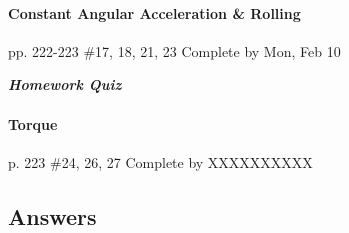 \documentclass[10pt]{exam}
\begin{document}



\paragraph{Constant Angular Acceleration \& Rolling} pp. 222-223 \#17, 18, 21, 23
\dotfill Complete by Mon, Feb 10

\hfill \textbf{\emph{Homework Quiz}}





\paragraph{Torque} p. 223 \#24, 26, 27
\dotfill Complete by XXXXXXXXXX








\subsection*{Answers}
\end{document}
